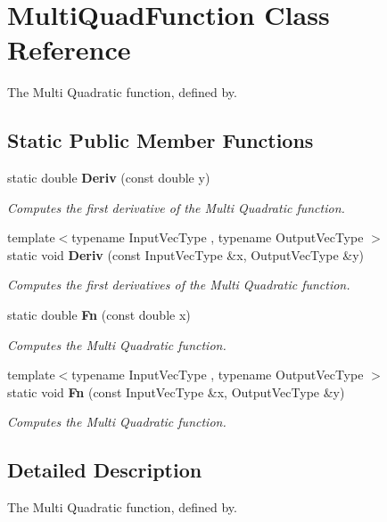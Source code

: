 \section{Multi\+Quad\+Function Class Reference}
\label{classmlpack_1_1ann_1_1MultiQuadFunction}


The Multi Quadratic function, defined by.  


\subsection*{Static Public Member Functions}
\begin{DoxyCompactItemize}
\item 
static double \textbf{ Deriv} (const double y)
\begin{DoxyCompactList}\small\item\em Computes the first derivative of the Multi Quadratic function. \end{DoxyCompactList}\item 
{\footnotesize template$<$typename Input\+Vec\+Type , typename Output\+Vec\+Type $>$ }\\static void \textbf{ Deriv} (const Input\+Vec\+Type \&x, Output\+Vec\+Type \&y)
\begin{DoxyCompactList}\small\item\em Computes the first derivatives of the Multi Quadratic function. \end{DoxyCompactList}\item 
static double \textbf{ Fn} (const double x)
\begin{DoxyCompactList}\small\item\em Computes the Multi Quadratic function. \end{DoxyCompactList}\item 
{\footnotesize template$<$typename Input\+Vec\+Type , typename Output\+Vec\+Type $>$ }\\static void \textbf{ Fn} (const Input\+Vec\+Type \&x, Output\+Vec\+Type \&y)
\begin{DoxyCompactList}\small\item\em Computes the Multi Quadratic function. \end{DoxyCompactList}\end{DoxyCompactItemize}


\subsection{Detailed Description}
The Multi Quadratic function, defined by. 

